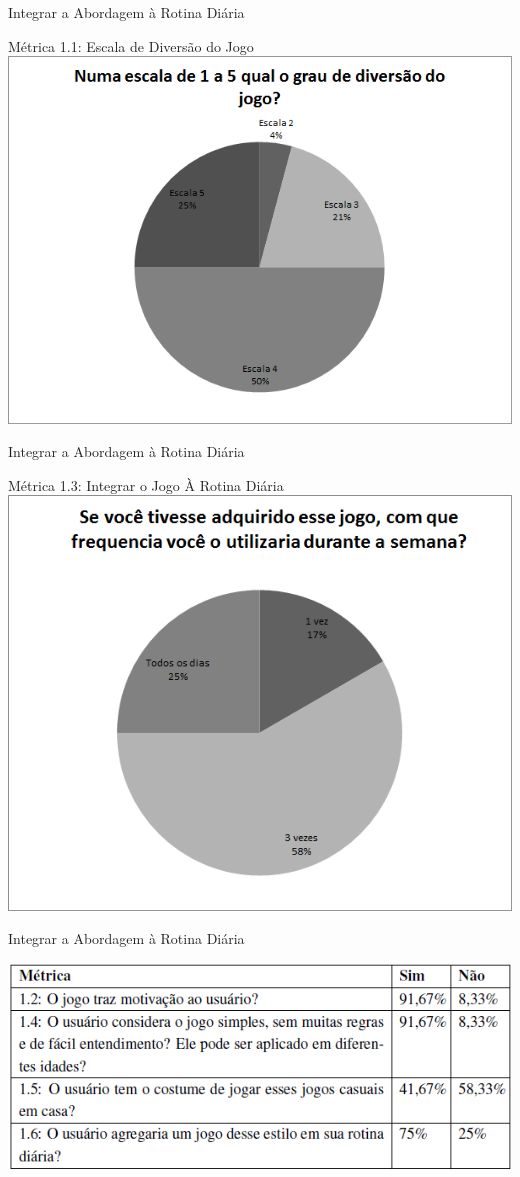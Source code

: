 \documentclass{beamer}
\begin{document}
\begin{frame}{Integrar a Abordagem à Rotina Diária} 
    \begin{block}{Métrica 1.1: Escala de Diversão do Jogo}
			\center \includegraphics[height=2.4 in]{img/chart_1-.png}
    \end{block}
\end{frame}

\begin{frame}{Integrar a Abordagem à Rotina Diária} 
    \begin{block}{Métrica 1.3: Integrar o Jogo À Rotina Diária}
			\center \includegraphics[height=2.4 in]{img/chart_3-.png}
    \end{block}
\end{frame}

\begin{frame}{Integrar a Abordagem à Rotina Diária} 
    \begin{block}{}
			\center \includegraphics[height=1.4 in]{img/metricasq1.png}
    \end{block}
\end{frame}
\end{document}
